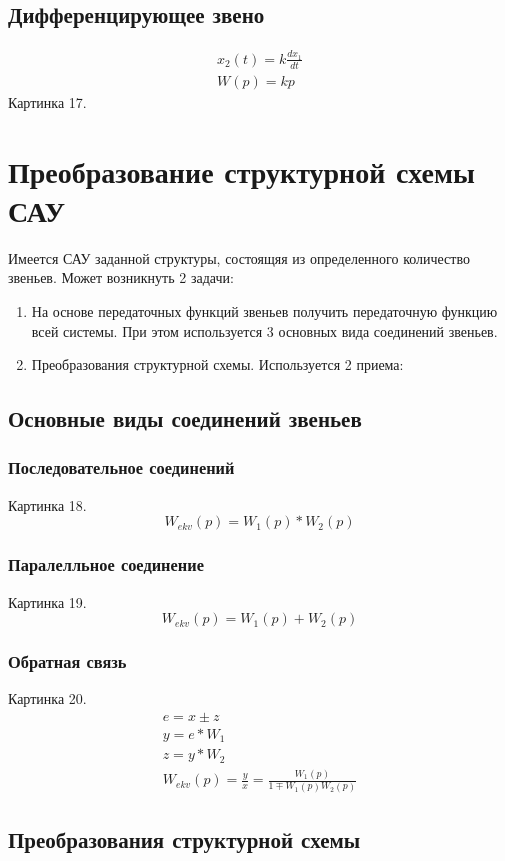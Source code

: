 \subsection{Дифференцирующее звено}
	\begin{gather*}
		x_2(t)=k\frac{dx_1}{dt}\\
		W(p)=kp
	\end{gather*}
	Картинка 17.

\section{Преобразование структурной схемы САУ}
Имеется САУ заданной структуры, состоящяя из определенного количество звеньев. Может возникнуть 2 задачи:
\begin{enumerate}
	\item На основе передаточных функций звеньев получить передаточную функцию всей системы. При этом используется 3 основных вида соединений звеньев.
	\item Преобразования структурной схемы. Используется 2 приема:
\end{enumerate}

\subsection{Основные виды соединений звеньев}
\subsubsection{Последовательное соединений}
Картинка 18.
$$W_{ekv}(p)=W_1(p)*W_2(p)$$
\subsubsection{Паралелльное соединение}
Картинка 19.
$$W_{ekv}(p)=W_1(p)+W_2(p)$$
\subsubsection{Обратная связь}
Картинка 20.
\begin{gather*}
	e=x\pm{}z\\
	y=e*W_1\\
	z=y*W_2\\
	W_{ekv}(p)=\frac{y}{x}=\frac{W_1(p)}{1\mp{}W_1(p)W_2(p)}
\end{gather*}
\subsection{Преобразования структурной схемы}
